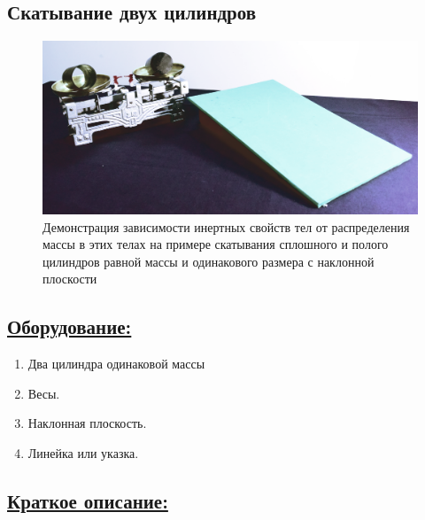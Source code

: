 \documentclass[14pt,a4paper,oneside]{extarticle}	%
\begin{document}
	
	

	\begin{center}
		\subsection*{Скатывание двух цилиндров}
	\end{center}
		

\begin{figure}[H] 	
	\centering 	
	\includegraphics[width=0.9\linewidth]{inclinedplane-1.png}
	\caption{Демонстрация зависимости инертных свойств тел от распределения массы в этих телах на примере скатывания сплошного и полого цилиндров равной массы и одинакового размера с наклонной плоскости}
	\label{inclinedplane-1}
\end{figure}
	
	\subsection*{\underline{Оборудование:}}

		\begin{enumerate}
			\item Два цилиндра одинаковой массы
			\item Весы.
			\item Наклонная плоскость.
			\item Линейка или указка.
		\end{enumerate}
		
	\subsection*{\underline{Краткое описание:}}
		
\end{document}
